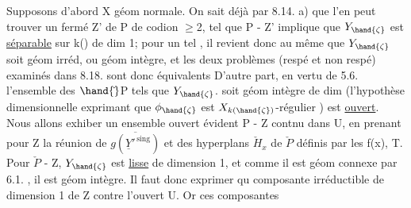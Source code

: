 

Supposons d'abord X géom normale. On sait déjà par 8.14. a)  que
l'en  peut trouver un fermé Z' de P de codion $\geq$2, tel que
\hand{$\zeta\in$} P - Z'  implique que  $Y_{\hand{\zeta}}$  est  \uline{séparable} sur k(\hand{$\zeta$}) de  dim 1; pour
un tel \hand{$\zeta$} , il revient donc au même que $Y_{\hand{\zeta}}$ soit géom irréd, ou géom
intègre, et  les deux problèmes  (respé et non respé) examinés dans
8.18. sont donc équivalents D'autre part, en vertu de 5.6. l'ensemble
 des \hand{$\zeta\in$} $\hand{\check{}}$P  tels que  $Y_{\hand{\zeta}}$.  soit géom intègre de dim  (l'hypothèse
dimensionnelle exprimant que $\phi_{\hand{\zeta}}$ est $X_{k(\hand{\zeta})}$-régulier ) est \uline{ouvert}.
Nous allons exhiber un ensemble ouvert  évident  P - Z  contnu dans U,
en prenant pour  Z la réunion de  $\overline{g(\underline{Y}'^{\,\mathrm{sing}})}$  et des hyperplans $\check{H}_x$
de $\check{P}$  définis par les  f(x),  T.  Pour \hand{$\zeta\in$} $\check{P}$ - Z,  $Y_{\hand{\zeta}}$  est \uline{lisse}
de dimension 1, et comme il est géom connexe par 6.1. , il est géom
intègre.  Il faut donc  exprimer qu  composante irréductible
de dimension  1 de Z  contre l'ouvert U.  Or ces composantes
